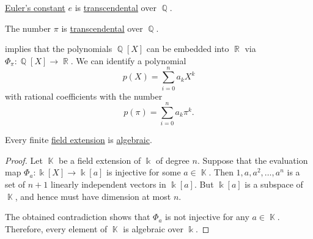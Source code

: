 \begin{theorem}\label{thm:eulers_constant_is_transcendental}
  \hyperref[def:exponential_function]{Euler's constant} \( e \) is \hyperref[def:transcendetal_element]{transcendental} over \( \BbbQ \).
\end{theorem}

\begin{theorem}[Pi is transcendental]\label{thm:pi_is_transcendental}
  The number \hyperref[def:pi]{\( \pi \)} is \hyperref[def:transcendetal_element]{transcendental} over \( \BbbQ \).
\end{theorem}

\begin{example}\label{ex:polynomials_over_pi}
   implies that the polynomials \( \BbbQ[X] \) can be embedded into \( \BbbR \) via \( \Phi_\pi: \BbbQ[X] \to \BbbR \). We can identify a polynomial
  \begin{equation*}
    p(X) = \sum_{i=0}^n a_k X^k
  \end{equation*}
  with rational coefficients with the number
  \begin{equation*}
    p(\pi) = \sum_{i=0}^n a_k \pi^k.
  \end{equation*}
\end{example}

\begin{lemma}\label{thm:finite_field_extensions_are_algebraic}
  Every finite \hyperref[def:field_extension]{field extension} is \hyperref[def:transcendetal_element]{algebraic}.
\end{lemma}
\begin{proof}
  Let \( \BbbK \) be a field extension of \( \Bbbk \) of degree \( n \). Suppose that the evaluation map \( \Phi_a: \Bbbk[X] \to \Bbbk[a] \) is injective for some \( a \in \BbbK \). Then \( 1, a, a^2, \ldots, a^n \) is a set of \( n + 1 \) linearly independent vectors in \( \Bbbk[a] \). But \( \Bbbk[a] \) is a subspace of \( \BbbK \), and hence must have dimension at most \( n \).

  The obtained contradiction shows that \( \Phi_a \) is not injective for any \( a \in \BbbK \). Therefore, every element of \( \BbbK \) is algebraic over \( \Bbbk \).
\end{proof}


